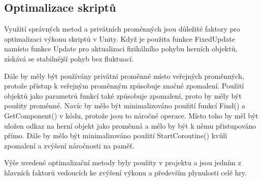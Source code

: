 \subsection{Optimalizace skriptů}
Využití správných metod a privátních proměnných jsou důležité faktory pro optimalizaci výkonu skriptů v Unity. Když je použita funkce FixedUpdate namísto funkce Update pro aktualizaci fizikálního pohybu herních objektů, získává se stabilnější pohyb bez fluktuací.

Dále by měly být používány privátní proměnné místo veřejných proměnných, protože přístup k veřejným proměnným způsobuje značné zpomalení. Použití objektů jako parametrů funkcí také způsobuje zpomalení, proto by měly být použity proměnné. Navíc by mělo být minimalizováno použití funkcí Find() a GetComponent() v kódu, protože jsou to náročné operace. Místo toho by měl být uložen odkaz na herní objekt jako proměnná a mělo by být k němu přistupováno přímo. Dále by mělo být minimalizováno použití StartCoroutine() kvůli zpomalení a zvýšení náročnosti na paměť.

Výše uvedené optimalizační metody byly použity v projektu a jsou jedním z hlavních faktorů vedoucích ke zvýšení výkonu a především plynulosti celé hry.